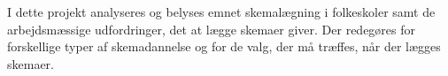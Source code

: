 I dette projekt analyseres og belyses emnet skemalægning i folkeskoler samt de arbejdsmæssige udfordringer, det at lægge skemaer giver. Der redegøres for forskellige typer af skemadannelse og for de valg, der må træffes, når der lægges skemaer.